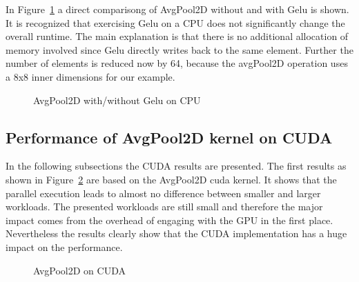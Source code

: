 \documentclass[letterpaper]{article}
\begin{document}
In Figure~\ref{cpuWithWithout} a direct comparisong of AvgPool2D without and with Gelu is shown. It is recognized that exercising Gelu on a CPU does not significantly change the overall runtime. The main explanation is that there is no additional allocation of memory involved since Gelu directly writes back to the same element. Further the number of elements is reduced now by 64, because the avgPool2D operation uses a 8x8 inner dimensions for our example.

\begin{figure}
\caption{AvgPool2D with/without Gelu on CPU}
\label{cpuWithWithout}
\end{figure}

\subsection{Performance of AvgPool2D kernel on CUDA} 

In the following subsections the CUDA results are presented. The first results as shown in Figure~\ref{cudaAvgPool} are based on the AvgPool2D cuda kernel. It shows that the parallel execution leads to almost no difference between smaller and larger workloads. The presented workloads are still small and therefore the major impact comes from the overhead of engaging with the GPU in the first place. Nevertheless the results clearly show that the CUDA implementation has a huge impact on the performance. 

\begin{figure}

\caption{AvgPool2D on CUDA}
\label{cudaAvgPool}
\end{figure}
\end{document}
